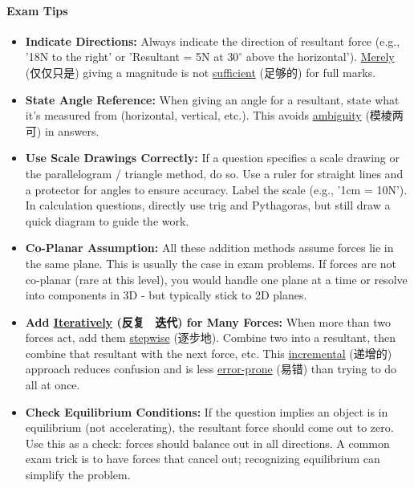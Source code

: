 \paragraph{Exam Tips}
\begin{itemize}
    \item \textbf{Indicate Directions:} Always indicate the direction of resultant force (e.g., '18N to the right' or 'Resultant
    = 5N at $30^\circ$ above the horizontal'). \underline{Merely} (仅仅只是) giving a magnitude is not \underline{sufficient}
    (足够的) for full marks.
    \item \textbf{State Angle Reference:} When giving an angle for a resultant, state what it's measured from (horizontal,
    vertical, etc.). This avoids \underline{ambiguity} (模棱两可) in answers.
    \item \textbf{Use Scale Drawings Correctly:} If a question specifies a scale drawing or the parallelogram / triangle method,
    do so. Use a ruler for straight lines and a protector for angles to ensure accuracy. Label the scale (e.g., '1cm = 10N'). In
    calculation questions, directly use trig and Pythagoras, but still draw a quick diagram to guide the work.
    \item \textbf{Co-Planar Assumption:} All these addition methods assume forces lie in the same plane. This is usually the case
    in exam problems. If forces are not co-planar (rare at this level), you would handle one plane at a time or resolve into
    components in 3D - but typically stick to 2D planes.
    \item \textbf{Add \underline{Iteratively} (反复 \ 迭代) for Many Forces:} When more than two forces act, add them
    \underline{stepwise} (逐步地). Combine two into a resultant, then combine that resultant with the next force, etc. This
    \underline{incremental} (递增的) approach reduces confusion and is less \underline{error-prone} (易错) than trying to do all
    at once.
    \item \textbf{Check Equilibrium Conditions:} If the question implies an object is in equilibrium (not accelerating), the
    resultant force should come out to zero. Use this as a check: forces should balance out in all directions. A common exam
    trick is to have forces that cancel out; recognizing equilibrium can simplify the problem.
\end{itemize}